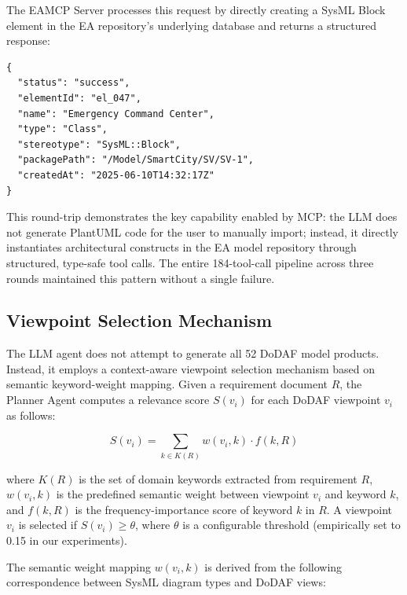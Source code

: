 \documentclass{ieeeaccess}
\begin{document}
The EAMCP Server processes this request by directly creating a SysML Block element in the EA repository's underlying database and returns a structured response:

{\footnotesize
\begin{verbatim}
{
  "status": "success",
  "elementId": "el_047",
  "name": "Emergency Command Center",
  "type": "Class",
  "stereotype": "SysML::Block",
  "packagePath": "/Model/SmartCity/SV/SV-1",
  "createdAt": "2025-06-10T14:32:17Z"
}
\end{verbatim}}

This round-trip demonstrates the key capability enabled by MCP: the LLM does not generate PlantUML code for the user to manually import; instead, it directly instantiates architectural constructs in the EA model repository through structured, type-safe tool calls. The entire 184-tool-call pipeline across three rounds maintained this pattern without a single failure.

\subsection{Viewpoint Selection Mechanism}
\label{sec:viewpoint_selection}

The LLM agent does not attempt to generate all 52 DoDAF model products. Instead, it employs a context-aware viewpoint selection mechanism based on semantic keyword-weight mapping. Given a requirement document $R$, the Planner Agent computes a relevance score $S(v_i)$ for each DoDAF viewpoint $v_i$ as follows:

\begin{equation}
\label{eq:viewpoint}
S(v_i) = \sum_{k \in K(R)} w(v_i, k) \cdot f(k, R)
\end{equation}

\noindent where $K(R)$ is the set of domain keywords extracted from requirement $R$, $w(v_i, k)$ is the predefined semantic weight between viewpoint $v_i$ and keyword $k$, and $f(k, R)$ is the frequency-importance score of keyword $k$ in $R$. A viewpoint $v_i$ is selected if $S(v_i) \geq \theta$, where $\theta$ is a configurable threshold (empirically set to 0.15 in our experiments).

The semantic weight mapping $w(v_i, k)$ is derived from the following correspondence between SysML diagram types and DoDAF views:
\end{document}

